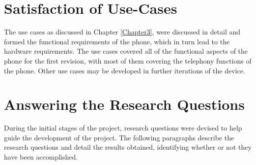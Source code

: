 
\section{Satisfaction of Use-Cases}

	The use cases as discussed in Chapter \ref{Chapter3}, were discussed in detail and formed the functional requirements of the phone, which in turn lead to the hardware requirements. 
The use cases covered all of the functional aspects of the phone for the first revision, with most of them covering the telephony functions of the phone.
Other use cases may be developed in further iterations of the device. 

\section{Answering the Research Questions}

During the initial stages of the project, research questions were devised to help guide the development of the project.
The following paragraphs describe the research questions and detail the results obtained, identifying whether or not they have been accomplished.\\

